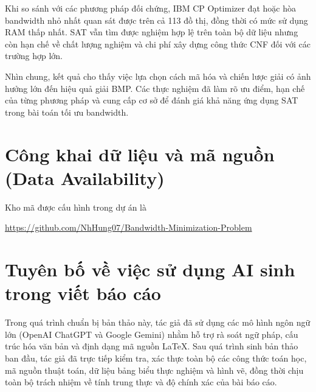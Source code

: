 \documentclass[a4paper,fleqn]{cas-sc}
\begin{document}
Khi so sánh với các phương pháp đối chứng, IBM CP Optimizer đạt hoặc hòa bandwidth nhỏ nhất quan sát được trên cả 113 đồ thị, đồng thời có mức sử dụng RAM thấp nhất. SAT vẫn tìm được nghiệm hợp lệ trên toàn bộ dữ liệu nhưng còn hạn chế về chất lượng nghiệm và chi phí xây dựng công thức CNF đối với các trường hợp lớn.

Nhìn chung, kết quả cho thấy việc lựa chọn cách mã hóa và chiến lược giải có ảnh hưởng lớn đến hiệu quả giải BMP. Các thực nghiệm đã làm rõ ưu điểm, hạn chế của từng phương pháp và cung cấp cơ sở để đánh giá khả năng ứng dụng SAT trong bài toán tối ưu bandwidth.

\section*{Công khai dữ liệu và mã nguồn (Data Availability)}
Kho mã được cấu hình trong dự án là
\begin{center}\url{https://github.com/NhHung07/Bandwidth-Minimization-Problem}\end{center}

\section*{Tuyên bố về việc sử dụng AI sinh trong viết báo cáo}
Trong quá trình chuẩn bị bản thảo này, tác giả đã sử dụng các mô hình ngôn ngữ lớn (OpenAI ChatGPT và Google Gemini) nhằm hỗ trợ rà soát ngữ pháp, cấu trúc hóa văn bản và định dạng mã nguồn LaTeX. Sau quá trình sinh bản thảo ban đầu, tác giả đã trực tiếp kiểm tra, xác thực toàn bộ các công thức toán học, mã nguồn thuật toán, dữ liệu bảng biểu thực nghiệm và hình vẽ, đồng thời chịu toàn bộ trách nhiệm về tính trung thực và độ chính xác của bài báo cáo.
\end{document}
